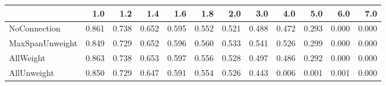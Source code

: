 \begin{tabular}{lrrrrrrrrrrr}
\toprule
{} &   1.0 &   1.2 &   1.4 &   1.6 &   1.8 &   2.0 &   3.0 &   4.0 &   5.0 &   6.0 &   7.0 \\
\midrule
NoConnection    & 0.861 & 0.738 & 0.652 & 0.595 & 0.552 & 0.521 & 0.488 & 0.472 & 0.293 & 0.000 & 0.000 \\
MaxSpanUnweight & 0.849 & 0.729 & 0.652 & 0.596 & 0.560 & 0.533 & 0.541 & 0.526 & 0.299 & 0.000 & 0.000 \\
AllWeight       & 0.863 & 0.738 & 0.653 & 0.597 & 0.556 & 0.528 & 0.497 & 0.486 & 0.292 & 0.000 & 0.000 \\
AllUnweight     & 0.850 & 0.729 & 0.647 & 0.591 & 0.554 & 0.526 & 0.443 & 0.006 & 0.001 & 0.001 & 0.000 \\
\bottomrule
\end{tabular}
